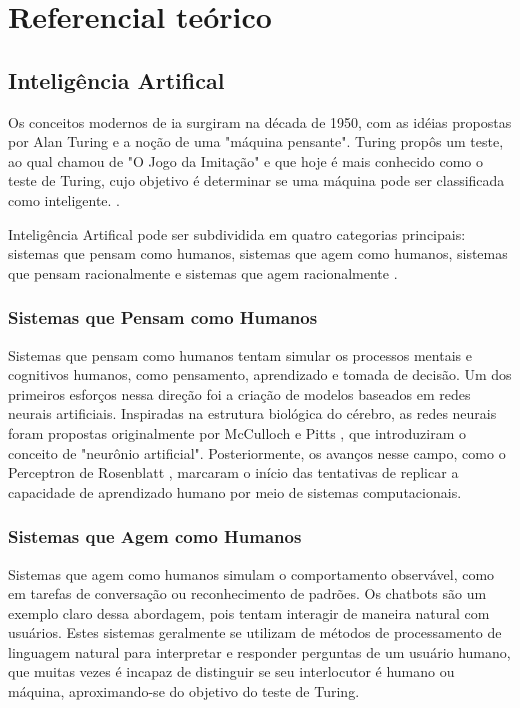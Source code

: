 \chapter{Referencial te\'orico}\label{cap:referencialTeorico}

\section{Inteligência Artifical}\label{sec:ia}

Os conceitos modernos de \gls{ia} surgiram na década de 1950, com as idéias propostas por Alan Turing e a noção de uma "máquina pensante". Turing propôs um teste, ao qual chamou de "O Jogo da Imitação" e que hoje é mais conhecido como o teste de Turing, cujo objetivo é determinar se uma máquina pode ser classificada como inteligente. \cite{Turing1950}.

Inteligência Artifical pode ser subdividida em quatro categorias principais: sistemas que pensam como humanos, sistemas que agem como humanos, sistemas que pensam racionalmente e sistemas que agem racionalmente \cite{RussellIA2021}.

\subsection{Sistemas que Pensam como Humanos}\label{subsec:ia1}

Sistemas que pensam como humanos tentam simular os processos mentais e cognitivos humanos, como pensamento, aprendizado e tomada de decisão. Um dos primeiros esforços nessa direção foi a criação de modelos baseados em redes neurais artificiais. Inspiradas na estrutura biológica do cérebro, as redes neurais foram propostas originalmente por McCulloch e Pitts \cite{McCulloch1943}, que introduziram o conceito de "neurônio artificial". Posteriormente, os avanços nesse campo, como o Perceptron de Rosenblatt \cite{Rosenblatt1958}, marcaram o início das tentativas de replicar a capacidade de aprendizado humano por meio de sistemas computacionais.

\subsection{Sistemas que Agem como Humanos}\label{subsec:ia2}

Sistemas que agem como humanos simulam o comportamento observável, como em tarefas de conversação ou reconhecimento de padrões. Os chatbots são um exemplo claro dessa abordagem, pois tentam interagir de maneira natural com usuários. Estes sistemas geralmente se utilizam de métodos de processamento de linguagem natural para interpretar e responder perguntas de um usuário humano, que muitas vezes é incapaz de distinguir se seu interlocutor é humano ou máquina, aproximando-se do objetivo do teste de Turing.


